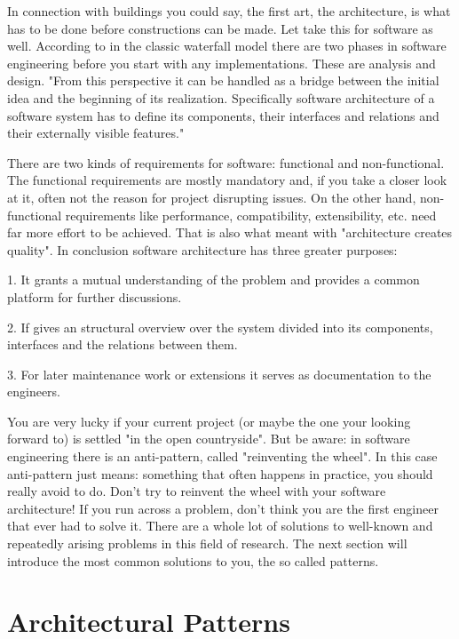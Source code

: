 In connection with buildings you could say, the first art, the architecture,  is what has to be done before  constructions can be made. Let take this for software as well. According to \citep{sommerville} in the classic waterfall model there are two phases in software engineering before you start with any implementations. These are analysis and design. "From this perspective it can be handled as a bridge between the initial idea and the beginning of its realization. Specifically software architecture of a software system has to define its components, their interfaces and relations and their externally visible features."\citep{starke2011effektive}

There are two kinds of requirements for software: functional and non-functional. The functional requirements are mostly mandatory and, if you take a closer look at it, often not the reason for project disrupting issues. On the other hand, non-functional requirements like performance, compatibility, extensibility, etc. need far more effort to be achieved. That is also what \citep{starke2011effektive} meant with "architecture creates quality". In conclusion software architecture has three greater purposes:\linebreak

1. It grants a mutual understanding of the problem and provides a common platform for further discussions.

2. If gives an structural overview over the system divided into its components, interfaces and the relations between them. 

3. For later maintenance work or extensions it serves as documentation to the engineers.

You are very lucky if your current project (or maybe the one your looking forward to) is settled "in the open countryside".  But be aware: in software engineering there is an anti-pattern, called "reinventing the wheel". In this case anti-pattern just means: something that often happens in practice, you should really avoid to do. Don't try to reinvent the wheel with your software architecture! If you run across a problem, don't think you are the first engineer that ever had to solve it. There are a whole lot of solutions to well-known and repeatedly arising problems in this field of research. The next section will introduce the most common solutions to you, the so called patterns.


\pagebreak

\section{Architectural Patterns}

